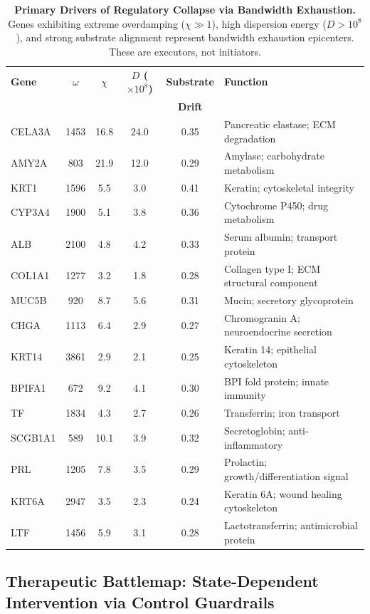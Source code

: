 \documentclass[11pt,letterpaper]{article}
\begin{document}
\begin{table}[h!]
\centering
\caption{\textbf{Primary Drivers of Regulatory Collapse via Bandwidth Exhaustion.} Genes exhibiting extreme overdamping ($\chi \gg 1$), high dispersion energy ($D > 10^8$), and strong substrate alignment represent bandwidth exhaustion epicenters. These are executors, not initiators.}
\label{tab:culprits}
\begin{tabular}{lccccp{5cm}}
\toprule
\textbf{Gene} & \textbf{$\omega$} & \textbf{$\chi$} & \textbf{$D$ ($\times 10^8$)} & \textbf{Substrate} & \textbf{Function} \\
 & & & & \textbf{Drift} & \\
\midrule
CELA3A & 1453 & 16.8 & 24.0 & 0.35 & Pancreatic elastase; ECM degradation \\
AMY2A & 803 & 21.9 & 12.0 & 0.29 & Amylase; carbohydrate metabolism \\
KRT1 & 1596 & 5.5 & 3.0 & 0.41 & Keratin; cytoskeletal integrity \\
CYP3A4 & 1900 & 5.1 & 3.8 & 0.36 & Cytochrome P450; drug metabolism \\
ALB & 2100 & 4.8 & 4.2 & 0.33 & Serum albumin; transport protein \\
COL1A1 & 1277 & 3.2 & 1.8 & 0.28 & Collagen type I; ECM structural component \\
MUC5B & 920 & 8.7 & 5.6 & 0.31 & Mucin; secretory glycoprotein \\
CHGA & 1113 & 6.4 & 2.9 & 0.27 & Chromogranin A; neuroendocrine secretion \\
KRT14 & 3861 & 2.9 & 2.1 & 0.25 & Keratin 14; epithelial cytoskeleton \\
BPIFA1 & 672 & 9.2 & 4.1 & 0.30 & BPI fold protein; innate immunity \\
TF & 1834 & 4.3 & 2.7 & 0.26 & Transferrin; iron transport \\
SCGB1A1 & 589 & 10.1 & 3.9 & 0.32 & Secretoglobin; anti-inflammatory \\
PRL & 1205 & 7.8 & 3.5 & 0.29 & Prolactin; growth/differentiation signal \\
KRT6A & 2947 & 3.5 & 2.3 & 0.24 & Keratin 6A; wound healing cytoskeleton \\
LTF & 1456 & 5.9 & 3.1 & 0.28 & Lactotransferrin; antimicrobial protein \\
\bottomrule
\end{tabular}
\end{table}

\subsection{Therapeutic Battlemap: State-Dependent Intervention via Control Guardrails}
\end{document}
